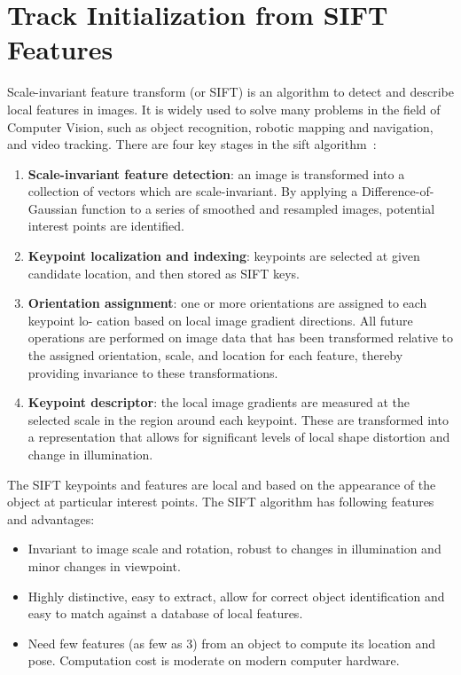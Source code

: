 \section{Track Initialization from SIFT Features}
\label{sec:sift_init}
Scale-invariant feature transform (or SIFT) is an algorithm to detect
and describe local features in images.  It is widely used to solve
many problems in the field of Computer Vision, such as object
recognition, robotic mapping and navigation, and video tracking. There are four key stages in the sift algorithm~\cite{lowe2004distinctive}:
\begin{enumerate}
\item \textbf{Scale-invariant feature detection}: an image is transformed into
  a collection of vectors which are scale-invariant. By applying a Difference-of-Gaussian
function to a series of smoothed and resampled images, potential
interest points are identified.
\item \textbf{Keypoint localization and indexing}: keypoints are selected at given
  candidate location, and then stored as SIFT keys.
\item \textbf{Orientation assignment}:  one or more orientations are assigned to each keypoint lo-
cation based on local image gradient directions. All future operations are performed
on image data that has been transformed relative to the assigned orientation, scale, and
location for each feature, thereby providing invariance to these transformations.
\item \textbf{Keypoint descriptor}: the local image gradients are measured at the selected scale
in the region around each keypoint. These are transformed into a representation that
allows for significant levels of local shape distortion and change in illumination.
\end{enumerate}


The SIFT keypoints and features are local and based on the appearance
of the object at particular interest points. The SIFT algorithm has following
features and advantages:
\begin{itemize}
\item Invariant to image scale and rotation, robust to changes in
  illumination and minor changes in viewpoint.
\item Highly distinctive, easy to extract, allow for correct object
  identification and easy to match against a database of local
  features. 
\item Need few features (as few as 3) from an object to compute its location
  and pose. Computation cost is moderate on modern computer hardware.
\end{itemize}

